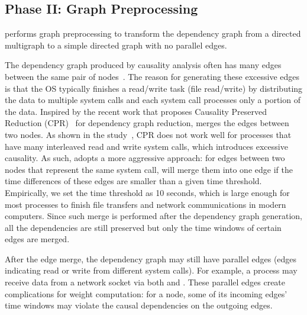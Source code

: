 


\subsection{Phase II: Graph Preprocessing}
\label{subsec:graph-preprocessing}

\tool performs graph preprocessing to transform the dependency graph from a directed multigraph to a simple directed graph with no parallel edges.

The dependency graph produced by causality analysis often has many edges between the same pair of nodes~\cite{reduction}.
The reason for generating these excessive edges is that the OS typically finishes a read/write task (\eg file read/write) by distributing the data to multiple system calls and each system call processes only a portion of the data.
Inspired by the recent work that proposes Causality Preserved Reduction (CPR)~\cite{reduction} for dependency graph reduction, \tool merges the edges between two nodes.
As shown in the study~\cite{reduction}, CPR does not work well for processes that have many interleaved read and write system calls, which introduces excessive causality.
As such, \tool adopts a more aggressive approach: for edges between two nodes that represent the same system call, 
\tool will merge them into one edge if the time differences of these edges are smaller than a given time threshold. 
Empirically, we set the time threshold as 10 seconds, 
which is large enough for most processes to finish file transfers and network communications in modern computers. 
Since such merge is performed after the dependency graph generation, all the dependencies are still preserved but only the time windows of certain edges are merged. 


After the edge merge, the dependency graph may still have parallel edges (\ie edges indicating read or write from different system calls).
For example, a process may receive data from a network socket via both  and .
These parallel edges create complications for weight computation: for a node, some of its incoming edges' time windows may violate the causal dependencies on the outgoing edges.

